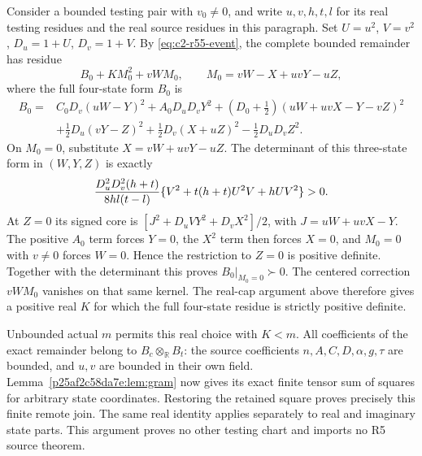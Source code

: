 Consider a bounded testing pair with $v_0\ne0$, and write $u,v,h,t,l$
for its real testing residues and the real source residues in this
paragraph. Set $U=u^2$, $V=v^2$, $D_u=1+U$, $D_v=1+V$.
By \eqref{eq:c2-r55-event}, the complete bounded remainder has residue
\[
 B_0+KM_0^2+vWM_0,\qquad M_0=vW-X+uvY-uZ,
\]
where the full four-state form $B_0$ is
\[
 \begin{split}
 B_0={}&C_0D_v(uW-Y)^2+A_0D_uD_vY^2
       +(D_0+\tfrac12)(uW+uvX-Y-vZ)^2\\
      &+\tfrac12D_u(vY-Z)^2
       +\tfrac12D_v(X+uZ)^2-\tfrac12D_uD_vZ^2.
 \end{split}
\]
On $M_0=0$, substitute $X=vW+uvY-uZ$. The determinant of this
three-state form in $(W,Y,Z)$ is exactly
\begin{equation}
 {D_u^2D_v^2(h+t)\over8hl(t-l)}
       \{V^2+t(h+t)U^2V+hUV^2\}>0.
 \label{eq:c2-r55-r6-kernel}
\end{equation}
At $Z=0$ its signed core is
$[J^2+D_uVY^2+D_vX^2]/2$, with
$J=uW+uvX-Y$. The positive $A_0$ term forces $Y=0$,
the $X^2$ term then forces $X=0$, and $M_0=0$ with $v\ne0$
forces $W=0$. Hence the restriction to $Z=0$ is positive definite.
Together with the determinant this proves $B_0|_{M_0=0}\succ0$.
The centered correction $vWM_0$ vanishes on that same kernel.
The real-cap argument above therefore gives a positive real $K$
for which the full four-state residue is strictly positive definite.

Unbounded actual $m$ permits this real choice with $K<m$. All
coefficients of the exact remainder belong to
$B_c\otimes_{\mathbb R}B_t$: the source coefficients
$n,A,C,D,\alpha,g,\tau$ are bounded, and $u,v$ are bounded in their
own field. Lemma~\ref{p25af2c58da7e:lem:gram} now gives its exact
finite tensor sum of squares for arbitrary state coordinates.
Restoring the retained square proves precisely this finite remote
join. The same real identity applies separately to real and imaginary
state parts. This argument proves no other testing chart and imports
no R5 source theorem.
